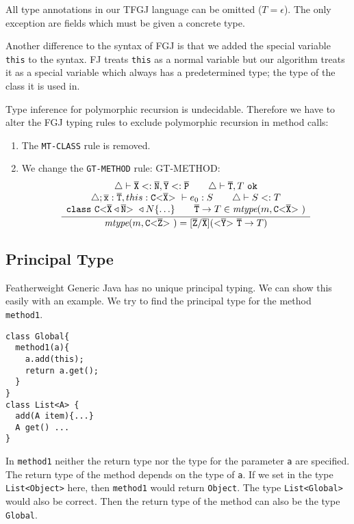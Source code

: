 All type annotations in our TFGJ language can be omitted ($T = \epsilon$).
The only exception are fields which must be given a concrete type.

Another difference to the syntax of FGJ is that we added the special variable \texttt{this} to the syntax.
FJ treats \texttt{this} as a normal variable
but our algorithm treats it as a special variable which always has a predetermined type;
the type of the class it is used in.

Type inference for polymorphic recursion is undecidable.
Therefore we have to alter the FGJ typing rules to exclude polymorphic recursion in method calls:
\begin{enumerate}
    \item The \texttt{MT-CLASS} rule is removed.
    \item We change the \texttt{GT-METHOD} rule:
GT-METHOD:
\begin{align*}
\frac{\displaystyle \begin{array}{c}
\triangle \vdash \overline{\tt X} <: \overline{\tt N}, \overline{\tt Y} <: \overline{\tt P}  \quad \quad 
\triangle \vdash \overline{\tt T}, T \ \texttt{ok} \\
\triangle ; \overline{\tt x}:\overline{\tt T}, this : \mathtt{C {\tt <} \overline{\tt X} {\tt >} \ } \vdash e_0 : S \quad \quad
\triangle \vdash S <: T \\
\texttt{class}\ \mathtt{C {\tt <} \overline{\tt X} \triangleleft \overline{\tt N} {\tt >} \ } \triangleleft N \{ \ldots \} \quad \quad
\overline{\tt T} \to T  \in \textit{mtype}(m, \mathtt{C {\tt <} \overline{\tt X} {\tt >} \ }) \\
\end{array}}{\displaystyle 
\textit{mtype}(m, \mathtt{C {\tt <} \overline{\tt Z} {\tt >} \ }) = [\overline{\tt Z} / \overline{\tt X}](\mathtt{ {\tt <} \overline{\tt Y} {\tt >} \ } \overline{\tt T} \to T)
}
\end{align*}
\end{enumerate}

\subsection{Principal Type}
Featherweight Generic Java has no unique principal typing.
We can show this easily with an example.
We try to find the principal type for the method \texttt{method1}.
\begin{lstlisting}
class Global{
  method1(a){
    a.add(this);
    return a.get();
  }
}
class List<A> {
  add(A item){...}
  A get() ...
}
\end{lstlisting}
In \texttt{method1} neither the return type nor the type for the parameter \texttt{a} are specified.
The return type of the method depends on the type of \texttt{a}.
If we set in the type \texttt{List<Object>} here, then \texttt{method1} would return \texttt{Object}.
The type \texttt{List<Global>} would also be correct.
Then the return type of the method can also be the type \texttt{Global}.

